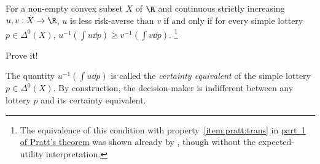 \begin{namedthm}
	\label{theorem:pratt_ce}
	For a non-empty convex subset $X$ of $\R$ and continuous strictly increasing $u,v : X \to \R$, $u$ is less risk-averse than $v$ if and only if for every simple lottery $p \in \Delta^0(X)$, $u^{-1}\left( \int u \dd p \right) \geq v^{-1}\left( \int v \dd p \right)$.%
		\footnote{The equivalence of this condition with property~\ref{item:pratt:trans} in \hyperref[theorem:pratt]{part~1 of Pratt's theorem} was shown already by \textcite[][Theorem~92]{HardyLittlewoodPolya1934}, though without the expected-utility interpretation.}
\end{namedthm}

\begin{exercise}[easy]
	\label{exercise:pratt_ce_pf}
	Prove it!
\end{exercise}

The quantity $u^{-1}\left( \int u \dd p \right)$ is called the \emph{certainty equivalent} of the simple lottery $p \in \Delta^0(X)$. By construction, the decision-maker is indifferent between any lottery $p$ and its certainty equivalent.

